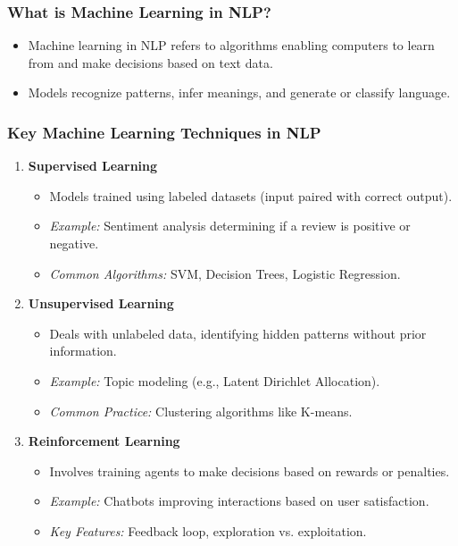 \documentclass[aspectratio=169]{beamer}
\begin{document}
\begin{frame}[fragile]
    \frametitle{What is Machine Learning in NLP?}
    \begin{itemize}
        \item Machine learning in NLP refers to algorithms enabling computers to learn from and make decisions based on text data.
        \item Models recognize patterns, infer meanings, and generate or classify language.
    \end{itemize}
\end{frame}

\begin{frame}[fragile]
    \frametitle{Key Machine Learning Techniques in NLP}
    \begin{enumerate}
        \item \textbf{Supervised Learning}
            \begin{itemize}
                \item Models trained using labeled datasets (input paired with correct output).
                \item \textit{Example:} Sentiment analysis determining if a review is positive or negative.
                \item \textit{Common Algorithms:} SVM, Decision Trees, Logistic Regression.
            \end{itemize}
        
        \item \textbf{Unsupervised Learning}
            \begin{itemize}
                \item Deals with unlabeled data, identifying hidden patterns without prior information.
                \item \textit{Example:} Topic modeling (e.g., Latent Dirichlet Allocation).
                \item \textit{Common Practice:} Clustering algorithms like K-means.
            \end{itemize}
            
        \item \textbf{Reinforcement Learning}
            \begin{itemize}
                \item Involves training agents to make decisions based on rewards or penalties.
                \item \textit{Example:} Chatbots improving interactions based on user satisfaction.
                \item \textit{Key Features:} Feedback loop, exploration vs. exploitation.
            \end{itemize}
    \end{enumerate}
\end{frame}
\end{document}
